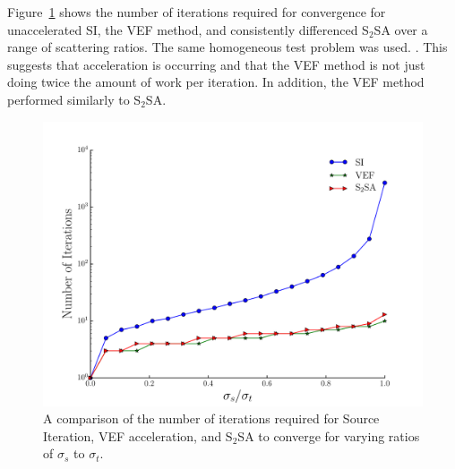 Figure~\ref{fig:si_vef_s2sa} shows the number of iterations required for convergence for unaccelerated SI, the VEF method, and consistently differenced S$_2$SA over a range of scattering ratios. The same homogeneous test problem was used. . This suggests that acceleration is occurring and that the VEF method is not just doing twice the amount of work per iteration. In addition, the VEF method performed similarly to S$_2$SA.

	\begin{figure}
		\centering
		\includegraphics[width=.75\textwidth]{figs/si_vef_s2sa.pdf} 
		\caption{A comparison of the number of iterations required for Source Iteration, VEF acceleration, and S$_2$SA to converge for varying ratios of $\sigma_s$ to $\sigma_t$. } 
		\label{fig:si_vef_s2sa}
	\end{figure}

